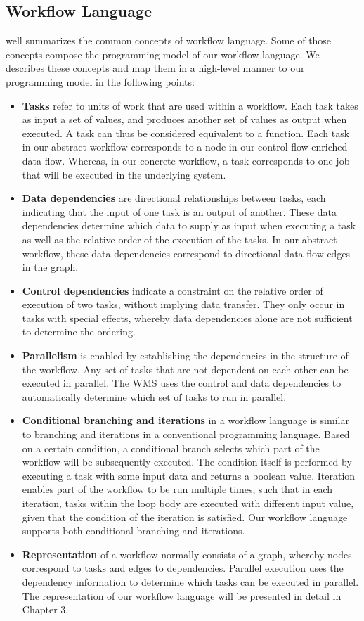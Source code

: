 \subsection{Workflow Language}\label{sec:WFLanguage}
\cite{kelly2011applying} well summarizes the common concepts of workflow language. Some of those concepts compose the programming model of our workflow language. We describes these concepts and map them in a high-level manner to our programming model in the following points:
\begin{itemize}
\item \textbf{Tasks} refer to units of work that are used within a workflow. Each task takes as input a set of values, and produces another set of values as output when executed. A task can thus be considered equivalent to a function. Each task in our abstract workflow corresponds to a node in our control-flow-enriched data flow. Whereas, in our concrete workflow, a task corresponds to one job that will be executed in the underlying system. 
\item \textbf{Data dependencies} are directional relationships between tasks, each indicating that the input of one task is an output of another. These data dependencies determine which data to supply as input when executing a task as well as the relative order of the execution of the tasks. In our abstract workflow, these data dependencies correspond to directional data flow edges in the graph. 
\item \textbf{Control dependencies} indicate a constraint on the relative order of execution of two tasks, without implying data transfer. They only occur in tasks with special effects, whereby data dependencies alone are not sufficient to determine the ordering.
\item \textbf{Parallelism} is enabled by establishing the dependencies in the structure of the workflow. Any set of tasks that are not dependent on each other can be executed in parallel. The WMS uses the control and data dependencies to automatically determine which set of tasks to run in parallel. 
\item \textbf{Conditional branching and iterations} in a workflow language is similar to branching and iterations in a conventional programming language. Based on a certain condition, a conditional branch selects which part of the workflow will be subsequently executed. The condition itself is performed by executing a task with some input data and returns a boolean value. Iteration enables part of the workflow to be run multiple times, such that in each iteration, tasks within the loop body are executed with different input value, given that the condition of the iteration is satisfied. Our workflow language supports both conditional branching and iterations. 
\item \textbf{Representation} of a workflow normally consists of a graph, whereby nodes correspond to tasks and edges to dependencies. Parallel execution uses the dependency information to determine which tasks can be executed in parallel. The representation of our workflow language will be presented in detail in Chapter 3. 
\end{itemize} 


